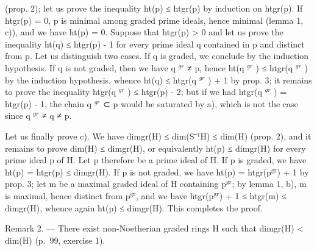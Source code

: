 (prop. 2); let us prove the inequality ht(p) ≤ htgr(p) by induction on htgr(p). If htgr(p) = 0, p is minimal among graded prime ideals, hence minimal (lemma 1, c)), and we have ht(p) = 0. Suppose that htgr(p) \textgreater{} 0 and let us prove the inequality ht(q) ≤ htgr(p) - 1 for every prime ideal q contained in p and distinct from p. Let us distinguish two cases. If q is graded, we conclude by the induction hypothesis. If q is not graded, then we have q \(^{gr}\) ≠ p, hence ht(q \(^{gr}\) ) ≤ htgr(q \(^{gr}\) ) by the induction hypothesis, whence ht(q) ≤ htgr(q \(^{gr}\) ) + 1 by prop. 3; it remains to prove the inequality htgr(q \(^{gr}\) ) ≤ htgr(p) - 2; but if we had htgr(q \(^{gr}\) ) = htgr(p) - 1, the chain q \(^{gr}\) ⊂ p would be saturated by a), which is not the case since q \(^{gr}\) ≠ q ≠ p.

Let us finally prove c). We have dimgr(H) ≤ dim(S⁻¹H) ≤ dim(H) (prop. 2), and it remains to prove dim(H) ≤ dimgr(H), or equivalently ht(p) ≤ dimgr(H) for every prime ideal p of H. Let p therefore be a prime ideal of H. If p is graded, we have ht(p) = htgr(p) ≤ dimgr(H). If p is not graded, we have ht(p) = htgr(p\(^{\mathrm{gr}}\)) + 1 by prop. 3; let m be a maximal graded ideal of H containing p\(^{\mathrm{gr}}\); by lemma 1, b), m is maximal, hence distinct from p\(^{\mathrm{gr}}\), and we have htgr(p\(^{\mathrm{gr}}\)) + 1 ≤ htgr(m) ≤ dimgr(H), whence again ht(p) ≤ dimgr(H). This completes the proof.

Remark 2. --- There exist non-Noetherian graded rings H such that dimgr(H) \textless{} dim(H) (p.~99, exercise 1).

